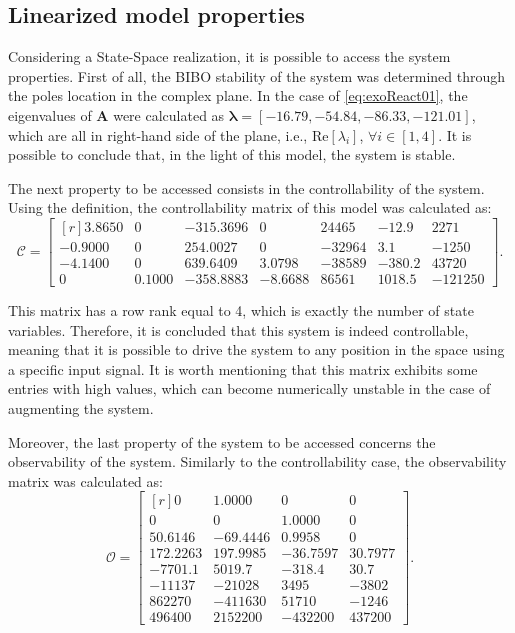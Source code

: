 \documentclass[a4paper,11pt]{book}
\numberwithin{figure}{chapter}
\numberwithin{equation}{chapter}
\numberwithin{table}{chapter}
\theoremstyle{definition}
\begin{document}
\subsection{Linearized model properties}

Considering a State-Space realization, it is possible to access the system properties. First of all, the BIBO stability of the system was determined through the poles location in the complex plane. In the case of \eqref{eq:exoReact01}, the eigenvalues of $\bm{A}$ were calculated as $\bm{\lambda} = [-16.79, -54.84, -86.33, -121.01]$, which are all in right-hand side of the plane, i.e., $\text{Re}[\lambda_i]$, $\forall i \in [1,4]$. It is possible to conclude that, in the light of this model, the system is stable.

The next property to be accessed consists in the controllability of the system. Using the definition, the controllability matrix of this model was calculated as:
\begin{equation}
	\bm{\mathcal{C}} = \begin{bmatrix*}[r]
	 3.8650  &      0 & -315.3696  &       0   &  24465 & -12.9 & 2271  \\
   -0.9000   &      0 &  254.0027  &       0   & -32964 & 3.1  & -1250 \\
   -4.1400  &      0  &  639.6409  &  3.0798   & -38589 & -380.2  & 43720 \\
         0  &  0.1000 & -358.8883  &   -8.6688 &  86561 & 1018.5  & -121250 
	\end{bmatrix*}
.\end{equation}

\noindent This matrix has a row rank equal to 4, which is exactly the number of state variables. Therefore, it is concluded that this system is indeed controllable, meaning that it is possible to drive the system to any position in the space using a specific input signal. It is worth mentioning that this matrix exhibits some entries with high values, which can become numerically unstable in the case of augmenting the system.

Moreover, the last property of the system to be accessed concerns the observability of the system. Similarly to the controllability case, the observability matrix was calculated as:
\begin{equation}
	\bm{\mathcal{O}} = \begin{bmatrix*}[r]
         0 &   1.0000 &        0  &       0 \\	
         0 &        0 &   1.0000  &       0 \\ 
   50.6146 & -69.4446 &   0.9958  &       0 \\
  172.2263 & 197.9985 & -36.7597  & 30.7977 \\
   -7701.1 &   5019.7 &  -318.4  &  30.7 \\
   -11137 &  -21028 &   3495 &  -3802 \\
   862270  & -411630  &  51710  & -1246 \\
   496400  &  2152200 &  -432200  &  437200
	\end{bmatrix*}
.\end{equation}
\end{document}
